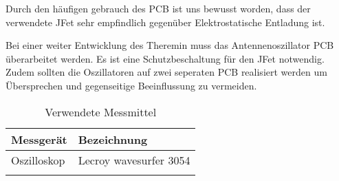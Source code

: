Durch den häufigen gebrauch des PCB ist uns bewusst worden, dass der verwendete JFet sehr empfindlich gegenüber Elektrostatische Entladung ist.

Bei einer weiter Entwicklung des Theremin muss das Antennenoszillator PCB überarbeitet werden. Es ist eine Schutzbeschaltung für den JFet notwendig. Zudem sollten die Oszillatoren auf zwei seperaten PCB realisiert werden um Übersprechen und gegenseitige Beeinflussung zu vermeiden. 

\begin{table}[H]
	\centering
	\caption{Verwendete Messmittel}
	\label{tab:Verwendete_Messmittel}
	\begin{tabular}{l|l}
		\textbf{Messgerät} & \textbf{Bezeichnung}	\\
		\hline \hline
		
		Oszilloskop  & Lecroy wavesurfer 3054   \\ 
		&        \\ 
		\hline
		
	\end{tabular}
\end{table} 